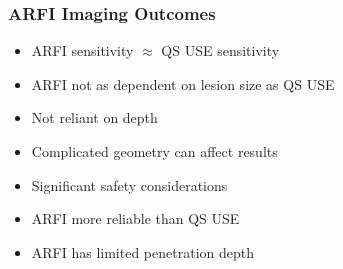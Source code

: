 \documentclass{beamer}
\begin{document}
		\begin{frame}
			\frametitle{ARFI Imaging Outcomes}
			\begin{itemize}
				\item ARFI sensitivity $\approx$ QS USE sensitivity
				\item ARFI not as dependent on lesion size as QS USE
				\item Not reliant on depth
				\item Complicated geometry can affect results
				\item Significant safety considerations
				\item \alert{ARFI more reliable than QS USE}
				\item \alert{ARFI has limited penetration depth}
			\end{itemize}
		\end{frame}
\end{document}
